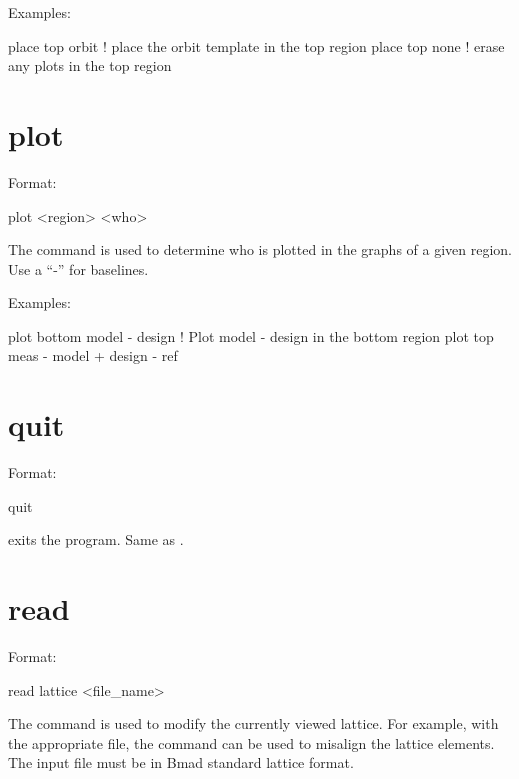 Examples:
\begin{example}
  place top orbit  ! place the orbit template in the top region
  place top none   ! erase any plots in the top region
\end{example}

\section{plot}
\label{s:plot}

Format:
\begin{example}
  plot <region> <who>
\end{example}

\vskip 0.2in 
The  command is used to determine who is plotted
in the graphs of a given region. Use a ``-'' for baselines. 

Examples:
\begin{example}
  plot bottom model - design       ! Plot model - design in the bottom region
  plot top meas - model + design - ref 
\end{example}

\section{quit}
\label{s:quit}

Format:
\begin{example}
  quit
\end{example}

\vskip 0.2in
 exits the program. Same as .

\section{read}
\label{s:read}

Format:
\begin{example}
  read lattice <file_name>
\end{example}

\vskip 0.2in 
The  command is used to modify the currently
viewed  lattice. For example, with the appropriate file,
the  command can be used to misalign the lattice
elements. The input file must be in Bmad standard lattice format.

